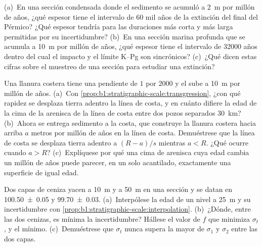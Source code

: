 \begin{exercise}[$\star\star$]\label{exo:b1:stratigraphic-scale:9}
(a)~En una sección condensada donde el sedimento se acumuló a \qty{2}{m} por millón de años, ¿qué espesor tiene el intervalo de \num{60} mil años de la extinción del final del Pérmico? ¿Qué espesor tendría para
las duraciones más corta y más larga permitidas por su incertidumbre? (b)~En una sección marina profunda que se acumula a \qty{10}{m} por millón de años, ¿qué espesor tiene el intervalo de \num{32000} años
dentro del cual el impacto y el límite K--Pg son sincrónicos? (c)~¿Qué dicen estas cifras sobre el muestreo de una sección para estudiar una extinción?
\end{exercise}

\begin{exercise}[$\star\star\star$]\label{exo:b1:stratigraphic-scale:10}
Una llanura costera tiene una pendiente de $1$ por $2000$ y el  sube a \qty{10}{m} por millón de años. (a)~Con \cref{prop:b1:stratigraphic-scale:transgression}, ¿con qué rapidez
se desplaza tierra adentro la línea de costa, y en cuánto difiere la edad de la cima de la arenisca de la línea de costa entre dos pozos separados \qty{30}{km}? (b)~Ahora se entrega sedimento a la costa, que
construye la llanura costera hacia arriba $a$ metros por millón de años en la línea de costa. Demuéstrese que la línea de costa se desplaza tierra adentro a $(R - a)/s$ mientras $a < R$. ¿Qué ocurre cuando
$a > R$? (c)~Explíquese por qué una cima de arenisca cuya edad cambia un millón de años puede parecer, en un solo acantilado, exactamente una superficie de igual edad.
\end{exercise}

\begin{exercise}[$\star\star\star$]\label{exo:b1:stratigraphic-scale:11}
Dos capas de ceniza yacen a \qty{10}{m} y a \qty{50}{m} en una sección y se datan en \qty[uncertainty-mode=separate]{100.50(5)}{\Ma} y \qty[uncertainty-mode=separate]{99.70(3)}{\Ma}. (a)~Interpólese la edad de un nivel a
\qty{25}{m} y su incertidumbre con \cref{prop:b1:stratigraphic-scale:interpolation}. (b)~¿Dónde, entre las dos cenizas, es mínima la incertidumbre? Hállese el valor de $f$ que minimiza $\sigma_t$, y el mínimo.
(c)~Demuéstrese que $\sigma_t$ nunca supera la mayor de $\sigma_1$ y $\sigma_2$ entre las dos capas.
\end{exercise}

